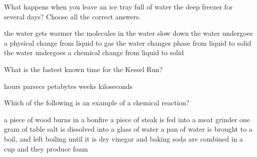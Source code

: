 \documentclass[11pt,addpoints]{exam}   	%
\begin{document}
\begin{questions}
\pagebreak

\question[5]
What happens when you leave an ice tray full of water the deep freezer for several days?
Choose all the correct answers.

\begin{choices}
\choice the water gets warmer
\choice the molecules in the water slow down
\choice the water undergoes a physical change from liquid to gas
\choice the water changes phase from liquid to solid
\choice the water undergoes a chemical change from liquid to solid
\end{choices}
\vspace{.2in}

\question[1] 
What is the fastest known time for the Kessel Run?

\begin{choices}
 hours
 parsecs
 petabytes
 weeks
 kiloseconds
\end{choices}
\vspace{.2in}

\question[5]
Which of the following is an example of a chemical reaction?

\begin{choices}
\choice a piece of wood burns in a bonfire
\choice a piece of steak is fed into a meat grinder
\choice one gram of table salt is dissolved into a glass of water
\choice a pan of water is brought to a boil, and left boiling until it is dry
\choice vinegar and baking soda are combined in a cup and they produce foam
\end{choices}
\vspace{.2in}


\end{questions}
\end{document}
